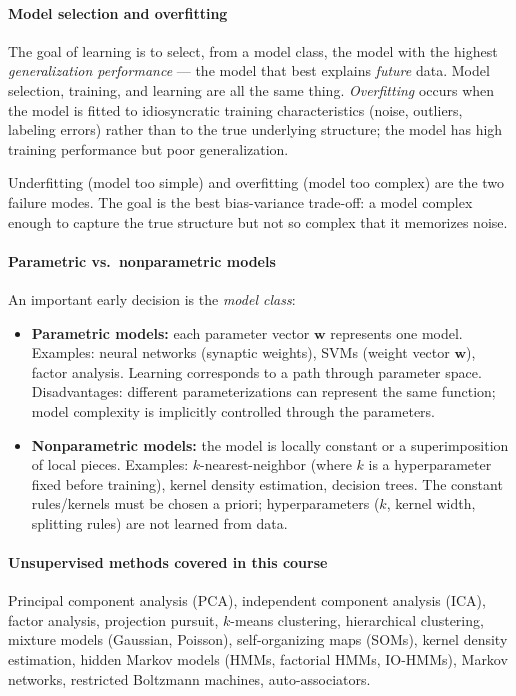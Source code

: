\documentclass[11pt, oneside]{book}
\newcommand{\wvec}{\bm{w}}
\begin{document}
\paragraph{Model selection and overfitting}
The goal of learning is to select, from a model class, the model with the highest
\emph{generalization performance} --- the model that best explains \emph{future} data.
Model selection, training, and learning are all the same thing.
\emph{Overfitting} occurs when the model is fitted to idiosyncratic training
characteristics (noise, outliers, labeling errors) rather than to the true underlying
structure; the model has high training performance but poor generalization.

\begin{intbox}
  Underfitting (model too simple) and overfitting (model too complex) are the two
  failure modes. The goal is the best bias-variance trade-off: a model complex enough
  to capture the true structure but not so complex that it memorizes noise.
\end{intbox}

\paragraph{Parametric vs.\ nonparametric models}
An important early decision is the \emph{model class}:

\begin{itemize}
  \item \textbf{Parametric models:} each parameter vector $\wvec$ represents one model.
        Examples: neural networks (synaptic weights), SVMs (weight vector $\wvec$), factor
        analysis. Learning corresponds to a path through parameter space.
        Disadvantages: different parameterizations can represent the same function; model
        complexity is implicitly controlled through the parameters.

  \item \textbf{Nonparametric models:} the model is locally constant or a superimposition
        of local pieces. Examples: $k$-nearest-neighbor (where $k$ is a hyperparameter fixed
        before training), kernel density estimation, decision trees.
        The constant rules/kernels must be chosen a priori; hyperparameters ($k$, kernel
        width, splitting rules) are not learned from data.
\end{itemize}

\paragraph{Unsupervised methods covered in this course}
Principal component analysis (PCA), independent component analysis (ICA), factor analysis,
projection pursuit, $k$-means clustering, hierarchical clustering, mixture models
(Gaussian, Poisson), self-organizing maps (SOMs), kernel density estimation, hidden Markov
models (HMMs, factorial HMMs, IO-HMMs), Markov networks, restricted Boltzmann machines,
auto-associators.
\end{document}
